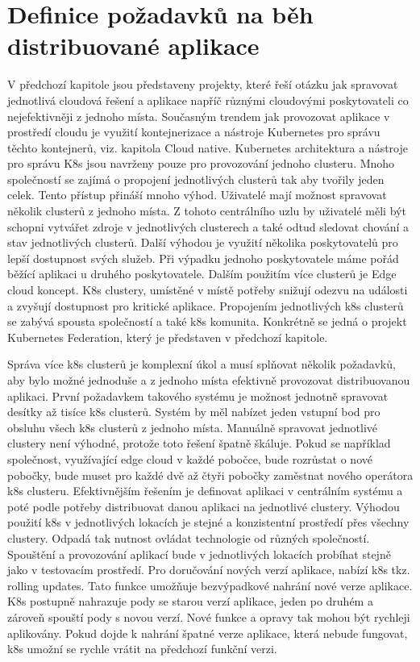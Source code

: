 \chapter{Definice požadavků na běh distribuované aplikace}
V předchozí kapitole jsou představeny projekty, které řeší otázku jak spravovat jednotlivá cloudová řešení a aplikace napříč různými cloudovými poskytovateli co nejefektivněji z jednoho místa. Současným trendem jak provozovat aplikace v prostředí cloudu je využití kontejnerizace a nástroje Kubernetes pro správu těchto kontejnerů, viz. kapitola Cloud native. Kubernetes architektura a nástroje pro správu K8s jsou navrženy pouze pro provozování jednoho clusteru. Mnoho společností se zajímá o propojení jednotlivých clusterů tak aby tvořily jeden celek. Tento přístup přináší mnoho výhod. Uživatelé mají možnost spravovat několik clusterů z jednoho místa. Z tohoto centrálního uzlu by uživatelé měli být schopni vytvářet zdroje v jednotlivých clusterech a také odtud sledovat chování a stav jednotlivých clusterů. Další výhodou je využití několika poskytovatelů pro lepší dostupnost svých služeb. Při výpadku jednoho poskytovatele máme pořád běžící aplikaci u druhého poskytovatele. Dalším použitím více clusterů je Edge cloud koncept. K8s clustery, umístěné v místě potřeby snižují odezvu na události a zvyšují dostupnost pro kritické aplikace. Propojením jednotlivých k8s clusterů se zabývá spousta společností a také k8s komunita. Konkrétně se jedná o projekt Kubernetes Federation, který je představen v předchozí kapitole. \par
     Správa více k8s clusterů je komplexní úkol a musí splňovat několik požadavků, aby bylo možné jednoduše a z jednoho místa efektivně provozovat distribuovanou aplikaci. První požadavkem takového systému je možnost jednotně spravovat desítky až tisíce k8s clusterů. Systém by měl nabízet jeden vstupní bod pro obsluhu všech k8s clusterů z jednoho místa.  Manuálně spravovat jednotlivé clustery není výhodné, protože toto řešení špatně škáluje. Pokud se například společnost, využívající edge cloud v každé pobočce, bude rozrůstat o nové pobočky, bude muset pro každé dvě až čtyři pobočky zaměstnat nového operátora k8s clusteru. Efektivnějším řešením je definovat aplikaci v centrálním systému a poté podle potřeby distribuovat danou aplikaci na jednotlivé clustery. Výhodou použití k8s v jednotlivých lokacích je stejné a konzistentní prostředí přes všechny clustery. Odpadá tak nutnost ovládat technologie od různých společností. Spouštění a provozování aplikací bude v jednotlivých lokacích probíhat stejně jako v testovacím prostředí. Pro doručování nových verzí aplikace, nabízí k8s tkz. rolling updates. Tato funkce umožňuje bezvýpadkové nahrání nové verze aplikace. K8s postupně nahrazuje pody se starou verzí aplikace, jeden po druhém a zároveň spouští pody s novou verzí. Nové funkce a opravy tak mohou být rychleji aplikovány. Pokud dojde k nahrání špatné verze aplikace, která nebude fungovat, k8s umožní se rychle vrátit na předchozí funkční verzi. \par
